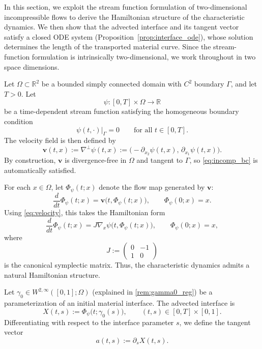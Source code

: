 \documentclass[12pt, reqno]{amsart}
\theoremstyle{plain}
\theoremstyle{definition}
\numberwithin{equation}{section}
\numberwithin{figure}{section}
\numberwithin{algorithm}{section}
\begin{document}
In this section, we exploit the stream function formulation of two-dimensional incompressible flows to derive the Hamiltonian structure of the characteristic dynamics. We then show that the advected interface and its tangent vector satisfy a closed ODE system (Proposition~\ref{prop:interface_ode}), whose solution determines the length of the transported material curve. Since the stream-function formulation is intrinsically two-dimensional, we work throughout in two space dimensions.

Let $\Omega \subset \mathbb{R}^2$ be a bounded simply connected domain with $C^2$ boundary $\Gamma$, and let $T>0$. Let
\[
\psi:[0,T]\times\Omega\to\mathbb{R}
\]
be a time-dependent stream function satisfying the homogeneous boundary condition
\[
\psi(t,\cdot)\big|_{\Gamma}=0
\qquad\text{for all } t\in[0,T].
\]
The velocity field is then defined by
\begin{equation}\label{eq:velocity}
\mathbf{v}(t,x):=\nabla^\perp \psi(t,x)
:=\bigl(-\partial_{x_2}\psi(t,x),\,\partial_{x_1}\psi(t,x)\bigr).
\end{equation}
By construction, $\mathbf v$ is divergence-free in $\Omega$ and tangent to $\Gamma$, so \eqref{eq:incomp_bc} is automatically satisfied.

For each $x\in\Omega$, let $\Phi_\psi(t;x)$ denote the flow map generated by $\mathbf v$:
\begin{equation*}
\frac{d}{dt}\Phi_\psi(t;x)=\mathbf{v}\bigl(t,\Phi_\psi(t;x)\bigr),
\qquad
\Phi_\psi(0;x)=x.
\end{equation*}
Using \eqref{eq:velocity}, this takes the Hamiltonian form
\begin{equation}\label{eq:hamiltonian_flow}
\frac{d}{dt}\Phi_\psi(t;x)=J\nabla_x \psi\bigl(t,\Phi_\psi(t;x)\bigr),
\qquad
\Phi_\psi(0;x)=x,
\end{equation}
where
\[
J:=
\begin{pmatrix}
0 & -1\\
1 & 0
\end{pmatrix}
\]
is the canonical symplectic matrix. Thus, the characteristic dynamics admits a natural Hamiltonian structure.

Let $\gamma_0\in W^{2,\infty}([0,1];\Omega)$ (explained in \ref{rem:gamma0_reg}) be a parameterization of an initial material interface. The advected interface is
\[
X(t,s):=\Phi_\psi\bigl(t;\gamma_0(s)\bigr),
\qquad
(t,s)\in[0,T]\times[0,1].
\]
Differentiating with respect to the interface parameter $s$, we define the tangent vector
\[
a(t,s):=\partial_s X(t,s).
\]
\end{document}
